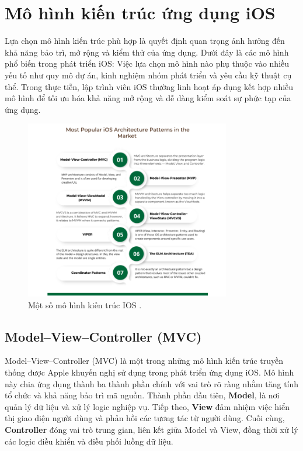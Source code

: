 \section{Mô hình kiến trúc ứng dụng iOS}
\hspace*{0.8cm}Lựa chọn mô hình kiến trúc phù hợp là quyết định quan trọng ảnh hưởng đến khả năng bảo trì, mở rộng và kiểm thử của ứng dụng. Dưới đây là các mô hình phổ biến trong phát triển iOS:
Việc lựa chọn mô hình nào phụ thuộc vào nhiều yếu tố như quy mô dự án, kinh nghiệm nhóm phát triển và yêu cầu kỹ thuật cụ thể. Trong thực tiễn, lập trình viên iOS thường linh hoạt áp dụng kết hợp nhiều mô hình để tối ưu hóa khả năng mở rộng và dễ dàng kiểm soát sự phức tạp của ứng dụng.

\begin{figure}[H] 
    \centering
    \includegraphics[width=0.8\textwidth]{images/mohinhkientrucios.png}
     \caption{Một số mô hình kiến trúc IOS \cite{MôHinhIOS}.}
    \label{fig:mohinhkientrucios}
\end{figure}
\subsection{Model–View–Controller (MVC)}
\hspace*{0.8cm}Model–View–Controller (MVC) là một trong những mô hình kiến trúc truyền thống được Apple khuyến nghị sử dụng trong phát triển ứng dụng iOS. Mô hình này chia ứng dụng thành ba thành phần chính với vai trò rõ ràng nhằm tăng tính tổ chức và khả năng bảo trì mã nguồn.
  Thành phần đầu tiên, \textbf{Model}, là nơi quản lý dữ liệu và xử lý logic nghiệp vụ. Tiếp theo, \textbf{View} đảm nhiệm việc hiển thị giao diện người dùng và phản hồi các tương tác từ người dùng. Cuối cùng, \textbf{Controller} đóng vai trò trung gian, liên kết giữa Model và View, đồng thời xử lý các logic điều khiển và điều phối luồng dữ liệu.

